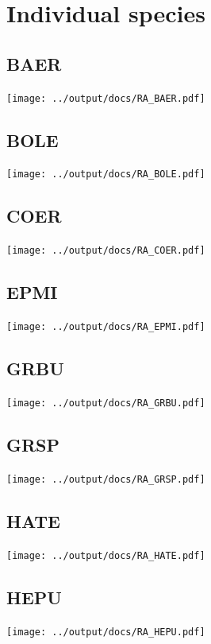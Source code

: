 \documentclass[10pt]{book} %
\begin{document}
\section{Individual species}
\subsection{BAER}
\texttt{[image: ../output/docs/RA\_BAER.pdf]}

\clearpage
\newpage
\subsection{BOLE}
\texttt{[image: ../output/docs/RA\_BOLE.pdf]}

\clearpage
\newpage
\subsection{COER}
\texttt{[image: ../output/docs/RA\_COER.pdf]}

\clearpage
\newpage
\subsection{EPMI}
\texttt{[image: ../output/docs/RA\_EPMI.pdf]}

\clearpage
\newpage
\subsection{GRBU}
\texttt{[image: ../output/docs/RA\_GRBU.pdf]}

\clearpage
\newpage
\subsection{GRSP}
\texttt{[image: ../output/docs/RA\_GRSP.pdf]}

\clearpage
\newpage
\subsection{HATE}
\texttt{[image: ../output/docs/RA\_HATE.pdf]}

\clearpage
\newpage
\subsection{HEPU}
\texttt{[image: ../output/docs/RA\_HEPU.pdf]}
\end{document}
